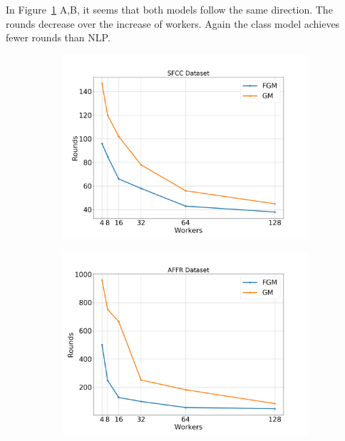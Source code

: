 In Figure~\ref{fig:sfcc-affr_3_2} A,B, it seems that both models follow the same direction.
The rounds decrease over the increase of workers.
Again the class model achieves fewer rounds than NLP\@.

\begin{figure}[H]
    \centering
    \begin{subfigure}[b]{0.45\textwidth}
        \centering
        \includegraphics[width=\textwidth]{./images/results/sfc-plots/exp_Fig_3_2.png}
        \caption{}
    \end{subfigure}
    \hfill
    \begin{subfigure}[b]{0.45\textwidth}
        \centering
        \includegraphics[width=\textwidth]{./images/results/amazon-plots/exp_Fig_3_2.png}
        \caption{}
    \end{subfigure}
    \caption{}
    \label{fig:sfcc-affr_3_2}
\end{figure}

